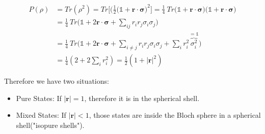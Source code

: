 \begin{equation}
    \begin{split}
        P(\rho) & = Tr(\rho^2) = Tr \bigg[ \bigg( \frac{1}{2} ( \mathds{1} + \mathbf{r}\cdot\mathbf{\sigma} \bigg)^2 \bigg] 
         = \frac{1}{4} \ Tr \bigg(\mathds{1} + \mathbf{r}\cdot\mathbf{\sigma} \bigg)\bigg(\mathds{1} + \mathbf{r}\cdot\mathbf{\sigma} \bigg) \\
        & = \frac{1}{4} \ Tr \bigg( \mathds{1} + 2 \mathbf{r}\cdot\mathbf{\sigma} + \sum_{ij} r_i r_j \sigma_i \sigma_j \bigg) \\
        & = \frac{1}{4} \ Tr \bigg( \mathds{1} + 2 \mathbf{r}\cdot\mathbf{\sigma} + \sum_{i \neq j} r_i r_j \sigma_i \sigma_j + \sum_{i } r_i^2  \overbrace{\sigma_i^2}^{=\mathds{1}} \bigg) \\
        & = \frac{1}{4} ( 2 + 2 \sum_i r_i^2) = \frac{1}{2} ( 1 + |\mathbf{r}|^2)
    \end{split}
\end{equation}

Therefore we have two situations:
\begin{itemize}
    \item Pure States: If $|\mathbf{r}|=1$, therefore it is in the spherical shell.
    \item Mixed States: If $|\mathbf{r}|<1$, those states are inside the Bloch sphere in a spherical shell("isopure shells").
\end{itemize}